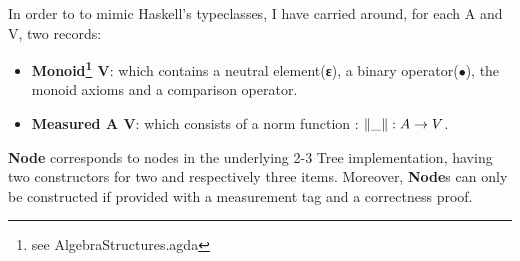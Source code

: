 \documentclass[12pt,twoside,notitlepage]{report}
\begin{document}
In order to to mimic Haskell's typeclasses, I have carried around, for each A and V, two records:

\begin{itemize} 
\item \textbf{Monoid\footnote{see AlgebraStructures.agda} V}: which contains a neutral element(\textbf{ε}), a binary operator(\textbf{$∙$}), the monoid axioms and a comparison operator.
\item \textbf{Measured A V}: which consists of a norm function  :  \textbf{$\Vert\_\Vert : \nolinebreak A \rightarrow V$}.
\end{itemize} 

\textbf{Node} corresponds to nodes in the underlying 2-3 Tree implementation, having two constructors for two and respectively three items. Moreover, \textbf{Node}s can only be constructed if provided with a measurement tag and a correctness proof.
  
\end{document}
